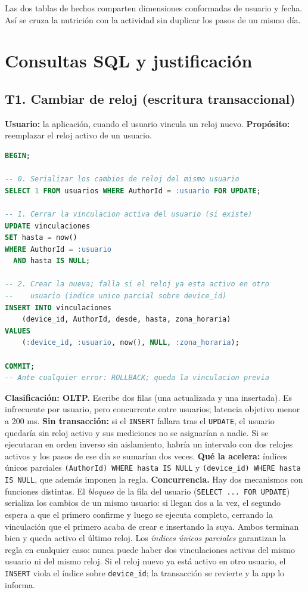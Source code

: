 \documentclass[11pt]{article}
\newcommand{\codigo}[1]{\texttt{\small #1}}
\begin{document}
Las dos tablas de hechos comparten dimensiones conformadas de usuario
y fecha. Así se cruza la nutrición con la actividad sin duplicar los
pasos de un mismo día.

\section{Consultas SQL y justificación}\label{an:sql}

\subsection{T1. Cambiar de reloj (escritura transaccional)}

\textbf{Usuario:} la aplicación, cuando el usuario vincula un reloj
nuevo. \textbf{Propósito:} reemplazar el reloj activo de un usuario.

\begin{lstlisting}[language=SQL]
BEGIN;

-- 0. Serializar los cambios de reloj del mismo usuario
SELECT 1 FROM usuarios WHERE AuthorId = :usuario FOR UPDATE;

-- 1. Cerrar la vinculacion activa del usuario (si existe)
UPDATE vinculaciones
SET hasta = now()
WHERE AuthorId = :usuario
  AND hasta IS NULL;

-- 2. Crear la nueva; falla si el reloj ya esta activo en otro
--    usuario (indice unico parcial sobre device_id)
INSERT INTO vinculaciones
    (device_id, AuthorId, desde, hasta, zona_horaria)
VALUES
    (:device_id, :usuario, now(), NULL, :zona_horaria);

COMMIT;
-- Ante cualquier error: ROLLBACK; queda la vinculacion previa
\end{lstlisting}

\textbf{Clasificación: OLTP.} Escribe dos filas (una actualizada y
una insertada). Es infrecuente por usuario, pero concurrente entre
usuarios; latencia objetivo menor a 200 ms.
\textbf{Sin transacción:} si el \codigo{INSERT} fallara tras el
\codigo{UPDATE}, el usuario quedaría sin reloj activo y sus
mediciones no se asignarían a nadie. Si se ejecutaran en orden
inverso sin aislamiento, habría un intervalo con dos relojes activos
y los pasos de ese día se sumarían dos veces.
\textbf{Qué la acelera:} índices únicos parciales
\codigo{(AuthorId) WHERE hasta IS NULL} y
\codigo{(device\_id) WHERE hasta IS NULL}, que además imponen la regla.
\textbf{Concurrencia.} Hay dos mecanismos con funciones distintas.
El \emph{bloqueo} de la fila del usuario (\codigo{SELECT ... FOR UPDATE})
serializa los cambios de un mismo usuario: si llegan dos a la vez, el
segundo espera a que el primero confirme y luego se ejecuta completo,
cerrando la vinculación que el primero acaba de crear e insertando la
suya. Ambos terminan bien y queda activo el último reloj. Los
\emph{índices únicos parciales} garantizan la regla en cualquier caso:
nunca puede haber dos vinculaciones activas del mismo usuario ni del
mismo reloj. Si el reloj nuevo ya está activo en otro usuario, el
\codigo{INSERT} viola el índice sobre \codigo{device\_id}; la
transacción se revierte y la app lo informa.
\end{document}
